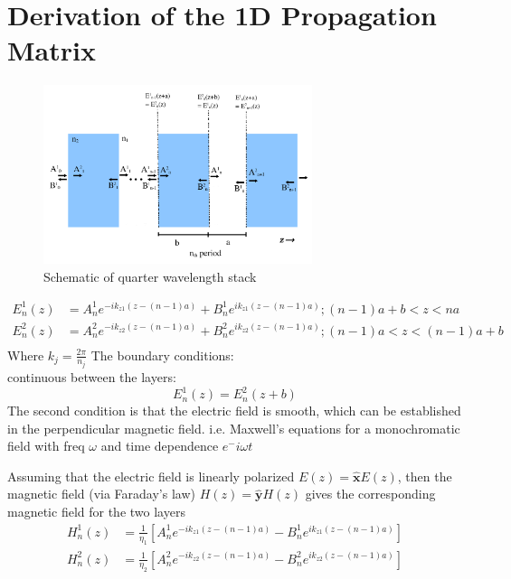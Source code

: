 \label{AppendixA}
\section{Derivation of the 1D Propagation Matrix }
\begin{figure}[h!]
	\centering
	\includegraphics[width=0.7\textwidth]{./Figures/HCPCF/DBR.png}
	\caption{Schematic of quarter wavelength stack}
	\label{1dstack}
\end{figure}

\begin{equation}
	\begin{aligned}
		E^1_n(z) &= A^1_n e^{-ik_{z1}(z-(n-1)a)} + B^1_n e^{ik_{z1}(z-(n-1)a)};  (n-1)a+b<z<na\\
		E^2_n(z) &= A^2_n e^{-ik_{z2}(z-(n-1)a)} + B^2_n e^{ik_{z2}(z-(n-1)a)};  (n-1)a<z<(n-1)a+b\\
	\end{aligned}
\end{equation}
Where $k _j= \frac{2\pi}{n_j}$
The boundary conditions:\\
continuous between the layers:
\begin{equation}
	E^1_n(z) = E^2_n(z+b)
\end{equation}
The second condition is that the electric field is smooth, which can be established in the perpendicular magnetic field. 
i.e. Maxwell's equations for a monochromatic field with freq $\omega$ and time dependence $e^-i\omega t$

Assuming that the electric field is linearly polarized $E(z) = \boldsymbol{\hat{x}}E(z)$, then the magnetic field (via Faraday's law) $H(z) = \boldsymbol{\hat{y}}H(z)$ gives the corresponding magnetic field for the two layers 
\begin{equation}
	\begin{aligned}
		H^1_n(z) &=\frac{1}{\eta_1}[A^1_n e^{-ik_{z1}(z-(n-1)a)} - B^1_n e^{ik_{z1}(z-(n-1)a)}]\\
		H^2_n(z) &= \frac{1}{\eta_2}[A^2_n e^{-ik_{z2}(z-(n-1)a)} - B^2_n e^{ik_{z2}(z-(n-1)a)}]
	\end{aligned}
\end{equation}

